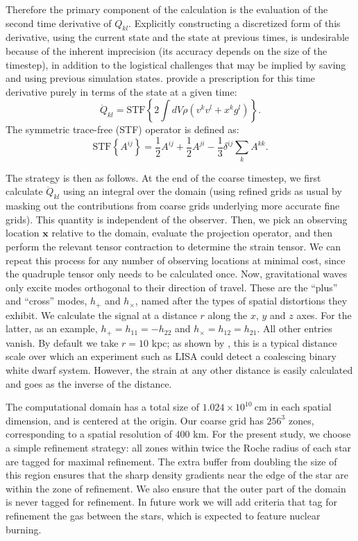 \documentclass[iop]{../emulateapj}
\begin{document}
Therefore the primary component of the calculation is the evaluation of the second time derivative of $Q_{kl}$.
Explicitly constructing a discretized form of this derivative, using the current state and the state at 
previous times, is undesirable because of the inherent imprecision (its accuracy depends on the size of the timestep),
in addition to the logistical challenges that may be implied by saving and using previous simulation states. 
\citet{blanchet:1990} provide a prescription for this time derivative purely in terms of the state at a given time:
\begin{equation}
  \ddot{Q}_{kl} = \text{STF}\left\{2\int dV \rho (v^k v^l + x^k g^l)\right\}.
\end{equation}
The symmetric trace-free (STF) operator is defined as:
\begin{equation}
  \text{STF}\left\{A^{ij}\right\} = \frac{1}{2}A^{ij} + \frac{1}{2}A^{ji} - \frac{1}{3} \delta^{ij} \sum_{k}A^{kk}.
\end{equation}

The strategy is then as follows. At the end of the coarse timestep, we first calculate $\ddot{Q}_{kl}$
using an integral over the domain (using refined grids as usual by masking out the contributions from 
coarse grids underlying more accurate fine grids). This quantity is independent of the observer. Then, 
we pick an observing location $\mathbf{x}$ relative to the domain, evaluate the projection operator, 
and then perform the relevant tensor contraction to determine the strain tensor. We can 
repeat this process for any number of observing locations at minimal cost, since the quadruple tensor 
only needs to be calculated once. Now, gravitational waves only excite modes orthogonal to their 
direction of travel. These are the ``plus'' and ``cross'' modes, $h_+$ and $h_\times$, named after 
the types of spatial distortions they exhibit. We calculate the signal at a distance $r$ along 
the $x$, $y$ and $z$ axes. For the latter, as an example, $h_{+} = h_{11} = -h_{22}$ and 
$h_{\times} = h_{12} = h_{21}$. All other entries vanish. By default we take $r = 10$ kpc; 
as shown by \citet{loren-aguilar:2005}, this is a typical distance scale over which an 
experiment such as LISA could detect a coalescing binary white dwarf system. 
However, the strain at any other distance is easily calculated and goes as the inverse of the distance.

The computational domain has a total size of $1.024 \times 10^{10}\ \text{cm}$ in each 
spatial dimension, and is centered at the origin. Our coarse grid has $256^3$ zones,
corresponding to a spatial resolution of 400 km. For the present study, we choose a simple 
refinement strategy: all zones within twice the Roche radius of each star are tagged for maximal 
refinement. The extra buffer from doubling the size of this region ensures that the sharp density
gradients near the edge of the star are within the zone of refinement. We also ensure that the 
outer part of the domain is never tagged for refinement. In future work we will add criteria 
that tag for refinement the gas between the stars, which is expected to feature nuclear burning.
\end{document}
